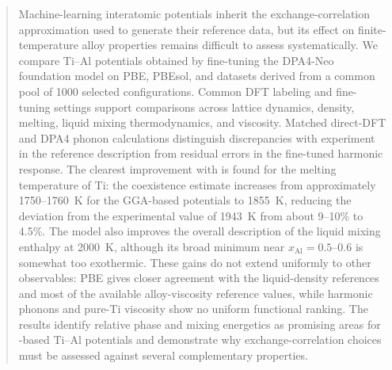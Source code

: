 \begin{abstract}
Machine-learning interatomic potentials inherit the exchange-correlation approximation used to generate their reference data, but its effect on finite-temperature alloy properties remains difficult to assess systematically.
We compare Ti--Al potentials obtained by fine-tuning the DPA4-Neo foundation model on PBE, PBEsol, and \rscan{} datasets derived from a common pool of 1000 selected configurations.
Common DFT labeling and fine-tuning settings support comparisons across lattice dynamics, density, melting, liquid mixing thermodynamics, and viscosity. Matched direct-DFT and DPA4 phonon calculations distinguish discrepancies with experiment in the reference description from residual errors in the fine-tuned harmonic response.
The clearest improvement with \rscan{} is found for the melting temperature of Ti: the coexistence estimate increases from approximately 1750--1760~K for the GGA-based potentials to 1855~K, reducing the deviation from the experimental value of 1943~K from about 9--10\% to 4.5\%.
The \rscan{} model also improves the overall description of the liquid mixing enthalpy at 2000~K, although its broad minimum near $x_{\mathrm{Al}}=0.5$--0.6 is somewhat too exothermic.
These gains do not extend uniformly to other observables: PBE gives closer agreement with the liquid-density references and most of the available alloy-viscosity reference values, while harmonic phonons and pure-Ti viscosity show no uniform functional ranking.
The results identify relative phase and mixing energetics as promising areas for \rscan{}-based Ti--Al potentials and demonstrate why exchange-correlation choices must be assessed against several complementary properties.
\end{abstract}
